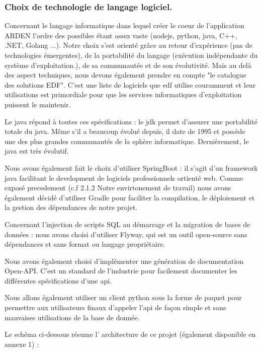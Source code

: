 \subsubsection{Choix de technologie de langage logiciel.}

Concernant le langage informatique dans lequel créer le coeur de l'application ARDEN l'ordre des possibles étant assez vaste (nodejs, python, java, C++, .NET, Golang ...). Notre choix s'est orienté grâce au retour d'expérience (pas de technologies émergentes), de la portabilité du langage (exécution indépendante du système d'exploitation.), de sa communautée et de son évolutivité. Mais au delà des aspect techniques, nous devons également prendre en compte "le catalogue des solutions EDF". C'est une liste de logiciels que \gls{edf} utilise couramment et leur utilisations est primordiale pour que les services informatiques d'exploitation puissent le maintenir. 

Le java répond à toutes ces spécifications : 
le \gls{jdk} permet d'assurer une portabilité totale du java. Même s'il a beaucoup évolué depuis, il date de 1995 et possède une des plus grandes communautés de la sphère informatique. Dernièrement, le java est très évolutif. 

Nous avons également fait le choix d'utiliser SpringBoot : il s'agit d'un framework java facilitant le development de logiciels professionnels ortienté web.
Comme exposé precedement (c.f 2.1.2 Notre envirtonement de travail) nous avons également décidé d'utiliser Gradle pour faciliter la compilation, le déploiement et la gestion des dépendances de notre projet.

Concernant l'injection de scripts SQL au démarrage et la migration de bases de données : nous avons choisi d'utiliser Flyway, qui est un outil open-source sans dépendances et sans format ou langage propriétaire.

Nous avons également choisi d'implémenter une génération de documentation Open-API. C'est un standard de l'industrie pour facilement documenter les différentes spécifications d'une \gls{api}.

Nous allons également utiliser un client python sous la forme de paquet pour permettre aux utilisateurs finaux d'appeler l'\gls{api} de façon simple et sans mauvaises utilisations de la base de donnée.

Le schéma ci-dessous résume l' architecture de ce projet (également disponible en annexe 1) : 


